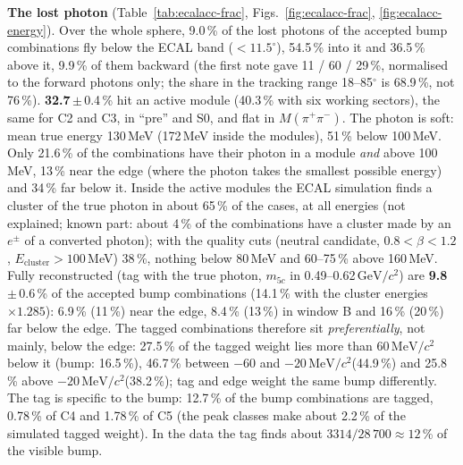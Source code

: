 \documentclass[11pt,a4paper]{article}
\newcommand{\Mpipi}{\ensuremath{M(\pi^{+}\pi^{-})}\xspace}
\newcommand{\GeVcc}{\ensuremath{\mathrm{GeV}/c^{2}}\xspace}
\newcommand{\MeVcc}{\ensuremath{\mathrm{MeV}/c^{2}}\xspace}
\newcommand{\code}[1]{\texttt{\detokenize{#1}}}
\newcommand{\tabin}[1]{}
\begin{document}
\textbf{The lost photon} (Table~\ref{tab:ecalacc-frac}, Figs.~\ref{fig:ecalacc-frac}, \ref{fig:ecalacc-energy}). Over the whole sphere, 9.0\,\% of
the lost photons of the accepted bump combinations fly below the ECAL band ($<11.5^\circ$), 54.5\,\% into it and 36.5\,\% above it, 9.9\,\% of them backward
(the first note gave 11 / 60 / 29\,\%, normalised to the forward photons only; the share in the tracking range 18--85$^\circ$ is 68.9\,\%, not
76\,\%). \textbf{32.7}\,$\pm$\,0.4\,\% hit an active module (40.3\,\% with six working sectors), the same for C2 and C3, in ``pre'' and S0, and flat in
\Mpipi. The photon is soft: mean true energy 130\,MeV (172\,MeV inside the modules), 51\,\% below 100\,MeV. Only 21.6\,\% of the combinations have their photon
in a module \emph{and} above 100\,MeV, 13\,\% near the edge (where the photon takes the smallest possible energy) and 34\,\% far below it. Inside the
active modules the ECAL simulation finds a cluster of the true photon in about 65\,\% of the cases, at all energies (not explained; known part:
about 4\,\% of the combinations have a cluster made by an $e^\pm$ of a converted photon); with the quality cuts (neutral candidate, $0.8<\beta<1.2$,
$E_{\mathrm{cluster}}>100$\,MeV) 38\,\%, nothing below 80\,MeV and 60--75\,\% above 160\,MeV. Fully reconstructed (tag with the true photon, $m_{5c}$
in 0.49--0.62\,\GeVcc) are \textbf{9.8}\,$\pm$\,0.6\,\% of the accepted bump combinations (14.1\,\% with the cluster energies $\times1.285$): 6.9\,\% (11\,\%) near
the edge, 8.4\,\% (13\,\%) in window B and 16\,\% (20\,\%) far below the edge. The tagged combinations therefore sit \emph{preferentially}, not mainly, below
the edge: 27.5\,\% of the tagged weight lies more than 60\,\MeVcc below it (bump: 16.5\,\%), 46.7\,\% between $-60$ and $-20$\,\MeVcc (44.9\,\%) and
25.8\,\% above $-20$\,\MeVcc (38.2\,\%); tag and edge weight the same bump differently. The tag is specific to the bump: 12.7\,\% of the bump combinations are
tagged, 0.78\,\% of C4 and 1.78\,\% of C5 (the peak classes make about 2.2\,\% of the simulated tagged weight). In the data the tag finds about
$3314/28\,700\approx12$\,\% of the visible bump.

\begin{table}[H]
\centering
\caption{\textbf{What it shows: one third of the lost photons hit an active module, about one fifth also carry more than 100\,MeV, and about one
tenth of the bump combinations is fully reconstructed, fewer near the edge.} Simulation, accepted bump combinations ``pre'' (SMASH $\times$ V3, expected raw
counts), per cent; window B and ``edge'' ($-15$ to $+5$\,\MeVcc from the edge). MC errors: 0.4--0.6 points for C2+C3 (Sect.~2.2 of the note).
Source: \code{tables_all/ecalacc_results.txt}.}
\label{tab:ecalacc-frac}
\footnotesize
\tabin{ecalacc_results.tex}
\end{table}
\end{document}
